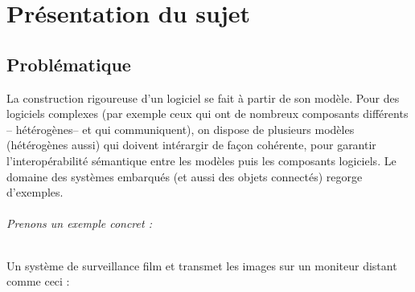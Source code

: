 \documentclass[12pt,a4paper]{report}
\begin{document}
\chapter{Présentation du sujet}


\section{Problématique}

La construction rigoureuse d'un logiciel se fait à partir de son modèle. Pour des 
logiciels complexes (par exemple ceux qui ont de nombreux composants différents -- 
hétérogènes-- et qui communiquent), on dispose de plusieurs modèles (hétérogènes 
aussi) qui doivent intérargir de façon cohérente, pour garantir l'interopérabilité 
sémantique entre les modèles puis les composants logiciels. Le domaine des systèmes 
embarqués (et aussi des objets connectés) regorge d'exemples.\\

\subparagraph*{Prenons un exemple concret :\\ }
Un système de surveillance film et transmet les images sur un moniteur distant comme ceci : 
\end{document}
